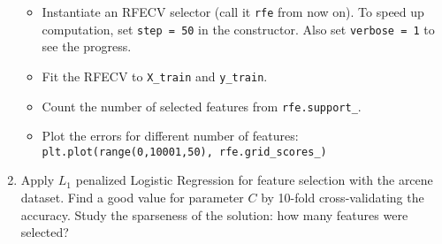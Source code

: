 \documentclass[a4paper,12pt]{scrartcl}
\newcommand{\python}{{\fbox{\texttt{\bfseries python}}\quad}}
\begin{document}
\begin{enumerate}
\begin{itemize}
	\item Instantiate an RFECV selector (call it \texttt{rfe} from now on). To speed up computation, set \texttt{step = 50} in the constructor.
	Also set \texttt{verbose = 1} to see the progress.
	\item Fit the RFECV to \verb+X_train+ and \verb+y_train+.
	\item Count the number of selected features from \verb+rfe.support_+.
	\item Plot the errors for different number of features:\\
	 \verb+plt.plot(range(0,10001,50), rfe.grid_scores_)+
\end{itemize}

\item \python Apply $L_1$ penalized Logistic Regression for feature selection with the arcene dataset.
Find a good value for parameter $C$ by 10-fold cross-validating the accuracy.
Study the sparseness of the solution: how many features were selected?

\end{enumerate}
\end{document}
